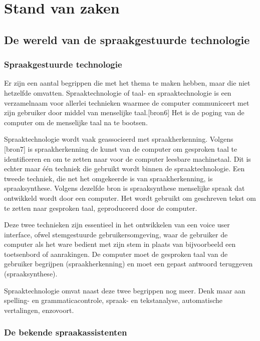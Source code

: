 \chapter{Stand van zaken}
\label{ch:stand-van-zaken}
\section{De wereld van de spraakgestuurde technologie}
\subsection{Spraakgestuurde technologie}
Er zijn een aantal begrippen die met het thema te maken hebben, maar die niet hetzelfde omvatten. Spraaktechnologie of taal- en spraaktechnologie is een verzamelnaam voor allerlei technieken waarmee de computer communiceert met zijn gebruiker door middel van menselijke taal.[bron6] Het is de poging van de computer om de menselijke taal na te bootsen.

Spraaktechnologie wordt vaak geassocieerd met spraakherkenning. Volgens [bron7] is spraakherkenning de kunst van de computer om gesproken taal te identificeren en om te zetten naar voor de computer leesbare machinetaal. Dit is echter maar één techniek die gebruikt wordt binnen de spraaktechnologie. Een tweede techniek, die net het omgekeerde is van spraakherkenning, is spraaksynthese. Volgens dezelfde bron is spraaksynthese menselijke spraak dat ontwikkeld wordt door een computer. Het wordt gebruikt om geschreven tekst om te zetten naar gesproken taal, geproduceerd door de computer.

Deze twee technieken zijn essentieel in het ontwikkelen van een voice user interface, ofwel stemgestuurde gebruikersomgeving, waar de gebruiker de computer als het ware bedient met zijn stem in plaats van bijvoorbeeld een toetsenbord of aanrakingen. De computer moet de gesproken taal van de gebruiker begrijpen (spraakherkenning) en moet een gepast antwoord teruggeven (spraaksynthese).

Spraaktechnologie omvat naast deze twee begrippen nog meer. Denk maar aan spelling- en grammaticacontrole, spraak- en tekstanalyse, automatische vertalingen, enzovoort.


\subsection{De bekende spraakassistenten}

